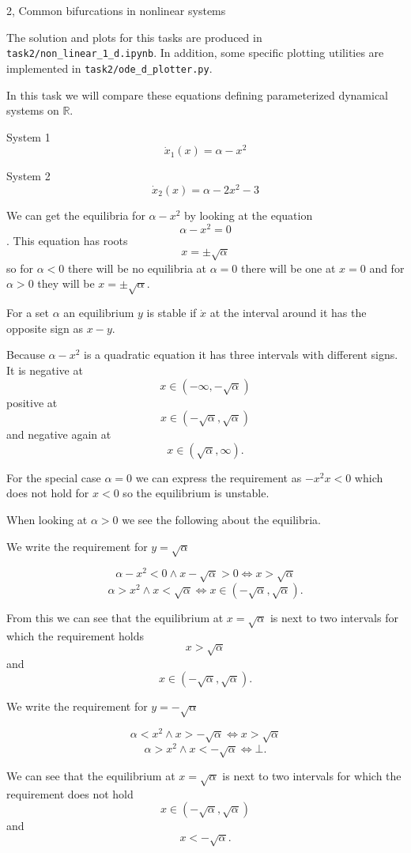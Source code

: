 \begin{task}{2, Common bifurcations in nonlinear systems}

The solution and plots for this tasks are produced in \verb|task2/non_linear_1_d.ipynb|. In addition, some specific plotting utilities are implemented in \verb|task2/ode_d_plotter.py|.

In this task we will compare these equations defining parameterized dynamical systems on $\mathbb{R}$.

System 1
$$\dot{x}_1(x) = \alpha - x^2$$

System 2
$$\dot{x}_2(x) = \alpha - 2x^2 - 3$$

We can get the equilibria for $\alpha - x^2$ by looking at the equation $$\alpha - x^2 = 0$$.
This equation has roots 
$$x = \pm \sqrt{\alpha}$$
so for $\alpha < 0$ there will be no equilibria at $\alpha = 0$ there will be one at $x = 0$ and for $\alpha > 0$ they will be $x = \pm \sqrt{\alpha}$.

For a set $\alpha$ an equilibrium $y$ is stable if $\dot x$ at the interval around it has the opposite sign as $x - y$.

Because $\alpha - x^2$ is a quadratic equation it has three intervals with different signs. It is negative at $$x \in (- \infty, -\sqrt{\alpha})$$
positive at $$x \in (-\sqrt{\alpha},\sqrt{\alpha})$$
and negative again at $$x \in (\sqrt{\alpha},\infty).$$

For the special case $\alpha = 0$ we can express the requirement as $-x^2 x < 0$ which does not hold for $x < 0$ so the equilibrium is unstable.

When looking at $\alpha > 0$ we see the following about the equilibria.

We write the requirement for $y = \sqrt{\alpha}$

$$\alpha - x^2 < 0 \land x - \sqrt{\alpha} > 0  \Leftrightarrow x > \sqrt{\alpha}$$
$$\alpha > x^2 \land x < \sqrt{\alpha} \Leftrightarrow x \in (-\sqrt{\alpha}, \sqrt{\alpha}).$$

From this we can see that the equilibrium at $x = \sqrt{\alpha}$ is next to two intervals for which the requirement holds $$x > \sqrt{\alpha}$$ and $$x \in (-\sqrt{\alpha}, \sqrt{\alpha}).$$

We write the requirement for $y = -\sqrt{\alpha}$

$$\alpha < x^2 \land x > -\sqrt{\alpha} \Leftrightarrow x > \sqrt{\alpha}$$
$$\alpha > x^2 \land x < -\sqrt{\alpha} \Leftrightarrow \bot.$$

We can see that the equilibrium at $x = \sqrt{\alpha}$ is next to two intervals for which the requirement does not hold 
$$x \in (-\sqrt{\alpha}, \sqrt{\alpha})$$ 
and $$x < -\sqrt{\alpha}.$$


\end{task}
